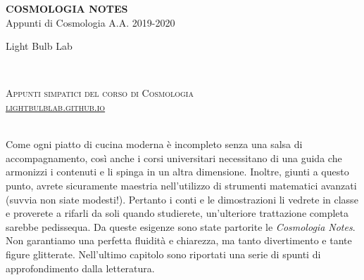 \documentclass[11pt,fleqn]{book} %
\begin{document}

\begingroup
\thispagestyle{empty}
\centering
\vspace*{5cm}
\par\normalfont\fontsize{35}{35}\sffamily\selectfont
\textbf{COSMOLOGIA NOTES}\\
{\LARGE Appunti di Cosmologia A.A. 2019-2020}\par %
\vspace*{1cm}
{\Huge Light Bulb Lab}\par %
\endgroup


\newpage
~\vfill
\thispagestyle{empty}


\noindent \textsc{Appunti simpatici del corso di Cosmologia} \\

\noindent \textsc{\href{https://lightbulblab.github.io}{lightbulblab.github.io}} \\ %

~\vfill

\noindent Come ogni piatto di cucina moderna è incompleto senza una salsa di accompagnamento, così anche i corsi universitari necessitano di una guida che armonizzi i contenuti e li spinga in un altra dimensione. Inoltre, giunti a questo punto, avrete sicuramente maestria nell'utilizzo di strumenti matematici avanzati (suvvia non siate modesti!). Pertanto i conti e le dimostrazioni li vedrete in classe e proverete a rifarli da soli quando studierete, un'ulteriore trattazione completa sarebbe pedissequa.  Da queste esigenze sono state partorite le \textit{Cosmologia Notes}. Non garantiamo una perfetta fluidità e chiarezza, ma tanto divertimento e tante figure glitterate. Nell'ultimo capitolo sono riportati una serie di spunti di approfondimento dalla letteratura.  \\ %

~\vfill
\end{document}
